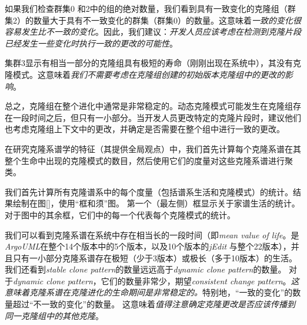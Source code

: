 {如果我们检查群集0 和2中的组的绝对数量，我们看到具有一致变化的克隆组（群集2）的数量大于具有不一致变化的群集（群集0）的数量。这意味着{\em 一致的变化很容易发生比不一致的变化}。因此，我们建议：{\em 开发人员应该考虑在检测到克隆片段已经发生一些变化时执行一致的更改的可能性}。

集群3显示有相当一部分的克隆组具有极短的寿命（刚刚出现在系统中），其没有克隆模式。这意味着{\em 我们不需要考虑在克隆组创建的初始版本克隆组中的更改的影响}。

总之，克隆组在整个进化中通常是非常稳定的。动态克隆模式可能发生在克隆组存在一段时间之后，但只有一小部分。当开发人员更改特定的克隆片段时，建议他们也考虑克隆组上下文中的更改，并确定是否需要在整个组中进行一致的更改。


在研究克隆系谱学的特征（其提供全局观点）中，我们首先计算每个克隆系谱在其整个生命中出现的克隆模式的数目，然后使用它们的度量对这些克隆系谱进行聚类。
 
\begin{figure}[htbp]
\centering
\subfigure{\label{cgestas1}}\addtocounter{subfigure}{-2}
\subfigure{\label{cgestas2}}\addtocounter{subfigure}{-2}
\vspace{-1em}
\end{figure}

我们首先计算所有克隆谱系中的每个度量（包括谱系生活和克隆模式）的统计。结果绘制在图\ref{}，使用“框和须”图。 第一个（最左侧）框显示关于家谱生活的统计。 对于图中的其余框，它们中的每一个代表每个克隆模式的统计。
 
我们可以看到克隆系谱在系统中存在相当长的一段时间（即{\em mean value of life}。是{\em  ArgoUML}在整个14个版本中的5个版本，以及10个版本的{\em jEdit }与整个22版本），并且只有一小部分克隆系谱存在极短（少于3版本）或极长（多于10版本）的生活。我们还看到{\em stable clone pattern}的数量远远高于{\em dynamic clone pattern}的数量。 对于{\em dynamic clone pattern}，它们的数量非常少，期望{\em consistent change pattern}。{\em 这意味着克隆系谱在克隆进化的生命期间是非常稳定的。}特别地，“一致的变化”的数量超过“不一致的变化”的数量。 这意味着{\em 值得注意确定克隆更改是否应该传播到同一克隆组中的其他克隆}。
  
}
